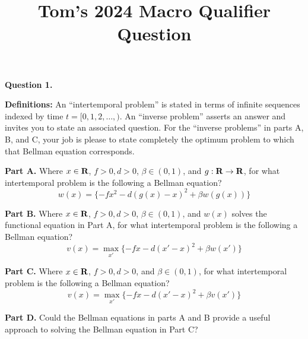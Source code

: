 \documentclass{article} %
\begin{document}
\date{}
\title{Tom's 2024 Macro Qualifier Question}

\maketitle
\noindent
 \textbf{Question 1.} 

\medskip
\noindent \textbf{Definitions:} 
An ``intertemporal problem'' is stated in terms of  infinite sequences indexed by time $t = [0, 1, 2, \ldots, )$.
An  ``inverse problem''  asserts an  answer and invites you to state an  associated question.
 For the ``inverse problems'' in parts A, B, and C,  your job is please to
state completely the optimum problem to which that Bellman equation corresponds.  




\medskip
\noindent
 \textbf{Part A.} Where $x \in {\bf R}$, $f >0, d >0 $,   $\beta \in (0,1)$, and $g : {\bf R} \rightarrow {\bf R}$, for what intertemporal problem is the following  a Bellman equation?
$$ w(x) =  \{- f x^2 - d(g(x)  - x)^2 + \beta w(g(x)) \}  $$


\medskip
\noindent 
\textbf{ Part B.}   Where $x \in {\bf R}$, $f >0, d >0 $,    $\beta \in (0,1)$, and $w(x)$ solves the functional equation in Part A,  for what intertemporal problem is the following  a Bellman equation?
$$ v(x) = \max_{x'} \{ - f x - d(x' - x)^2 + \beta w(x') \}
 $$


\medskip

\noindent
\textbf{ Part C.} Where $x \in {\bf R}$, $f >0, d >0 $, and   $\beta \in (0,1)$, for what intertemporal problem is the following  a Bellman equation?
$$ v(x) = \max_{x'} \{ - f x - d(x' - x)^2 + \beta v(x') \}
 $$

\medskip
\noindent 
\textbf{ Part D.} Could  the Bellman equations in parts A and B provide a useful  approach to solving the Bellman equation in Part C?
\end{document}
